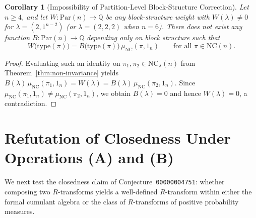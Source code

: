 \documentclass[11pt]{article}
\newtheorem{corollary}[theorem]{Corollary}
\theoremstyle{definition}
\newcommand{\NC}{\mathrm{NC}}
\newcommand{\btype}{\mathrm{type}}
\begin{document}
\begin{corollary}[Impossibility of Partition-Level Block-Structure Correction]\label{cor:no-block-table}
Let $n \ge 4$, and let $W : \mathrm{Par}(n) \to \mathbb{Q}$ be any block-structure weight with $W(\lambda) \neq 0$ for $\lambda = (2, 1^{n-2})$ (or $\lambda = (2,2,2)$ when $n = 6$). There does not exist any function $B : \mathrm{Par}(n) \to \mathbb{Q}$ depending only on block structure such that
\[
  W\bigl(\btype(\pi)\bigr) = B\bigl(\btype(\pi)\bigr)\,\mu_{\NC}(\pi, 1_n) \qquad \text{for all } \pi \in \NC(n).
\]
\end{corollary}
\begin{proof}
Evaluating such an identity on $\pi_1, \pi_2 \in \NC_\lambda(n)$ from Theorem~\ref{thm:non-invariance} yields $B(\lambda)\,\mu_{\NC}(\pi_1, 1_n) = W(\lambda) = B(\lambda)\,\mu_{\NC}(\pi_2, 1_n)$. Since $\mu_{\NC}(\pi_1, 1_n) \neq \mu_{\NC}(\pi_2, 1_n)$, we obtain $B(\lambda) = 0$ and hence $W(\lambda) = 0$, a contradiction.
\end{proof}

\section{Refutation of Closedness Under Operations (A) and (B)}

We next test the closedness claim of Conjecture~\texttt{00000004751}: whether composing two $R$-transforms yields a well-defined $R$-transform within either the formal cumulant algebra or the class of $R$-transforms of positive probability measures.
\end{document}

